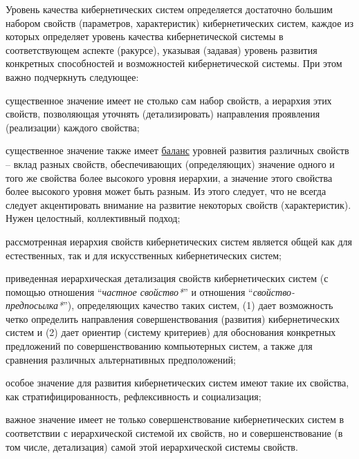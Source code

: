 \begin{SCn}
{Уровень качества кибернетических систем определяется достаточно большим набором свойств (параметров, характеристик) кибернетических систем, каждое из которых определяет уровень качества кибернетической системы в соответствующем аспекте (ракурсе), указывая (задавая) уровень развития конкретных  способностей и возможностей кибернетической системы. При этом важно подчеркнуть следующее:
\begin{scnitemize}
	\item существенное значение имеет не столько сам набор свойств, а иерархия этих свойств, позволяющая уточнять (детализировать) направления проявления (реализации) каждого свойства;
	\item существенное значение также имеет \uline{баланс} уровней развития различных свойств -- вклад разных свойств, обеспечивающих (определяющих) значение одного и того же свойства более высокого уровня иерархии, а значение этого свойства более высокого уровня может быть разным. Из этого следует, что не всегда следует акцентировать внимание на развитие некоторых свойств (характеристик). Нужен целостный, коллективный подход;
	\item рассмотренная иерархия свойств кибернетических систем является общей как для естественных, так и для искусственных кибернетических систем;
	\item приведенная иерархическая детализация свойств кибернетических систем (с помощью отношения ``\textit{частное свойство*}'' и отношения ``\textit{свойство-предпосылка*}''), определяющих качество таких систем, (1) дает возможность четко определить направления совершенствования (развития) кибернетических систем и (2) дает ориентир (систему критериев) для обоснования конкретных предложений по совершенствованию компьютерных систем, а также для сравнения различных альтернативных предположений;
	\item особое значение для развития кибернетических систем имеют такие их свойства, как стратифицированность, рефлексивность и социализация;
	\item важное значение имеет не только совершенствование кибернетических систем в соответствии с иерархической системой их свойств, но и совершенствование (в том числе, детализация) самой этой иерархической системы свойств. 
\end{scnitemize}}



\end{SCn}
